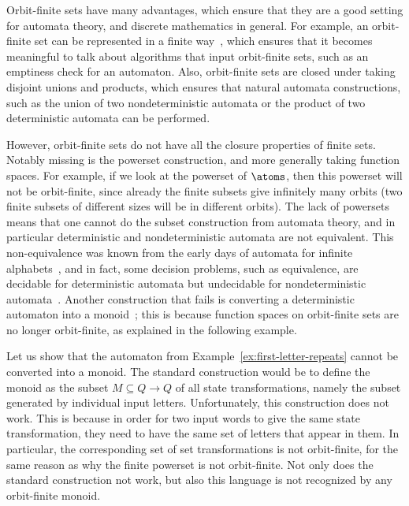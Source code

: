 Orbit-finite sets have many advantages, which ensure that they are a good setting for automata theory, and discrete mathematics in general. For example, an orbit-finite set can be represented in a finite way~\cite{bojanczyk_slightly2018}, which ensures that it becomes meaningful to talk about algorithms that input orbit-finite sets, such as an emptiness check for an automaton. Also, orbit-finite sets are closed under taking disjoint unions and products, which ensures that natural automata constructions, such as the union of two nondeterministic automata or the product of two deterministic automata can be performed.

However, orbit-finite sets do not have all the closure properties of finite sets. Notably missing is the powerset construction, and more generally taking function spaces. For example, if we look at the powerset of $\atoms$, then this powerset will not be orbit-finite, since already the finite subsets give infinitely many orbits (two finite subsets of different sizes will be in different orbits). The lack of powersets means that one cannot do the subset construction from automata theory, and in particular deterministic and nondeterministic automata are not equivalent. This non-equivalence was known from the early days of automata for infinite alphabets~\cite{kaminskiFiniteMemoryAutomata1994}, and in fact, some decision problems, such as equivalence, are decidable for deterministic automata but undecidable for nondeterministic automata~\cite{nevenFiniteStateMachines2004}. Another construction that fails is converting a deterministic automaton into a monoid~\cite[p.~221]{bojanczykNominalMonoids2013}; this is because function spaces on orbit-finite sets are no longer orbit-finite, as explained in the following example. 

\begin{example}\label{ex:first-letter-repeats-monoid}
    Let us show that the  automaton from Example~\ref{ex:first-letter-repeats} cannot be converted into a monoid. The standard construction would be to define the monoid as the subset $M \subseteq Q \to Q$ of all state transformations, namely the subset generated by individual input letters. 
    Unfortunately, this construction does not work. This is because in order  for  two input words to give the same state transformation, they need to have the same set of letters that appear in them. In particular, the corresponding set of set transformations is not orbit-finite, for the same reason as why the finite powerset is not orbit-finite. Not only does the standard construction not work, but also this language is not recognized by any orbit-finite monoid.\exampleend
\end{example}


